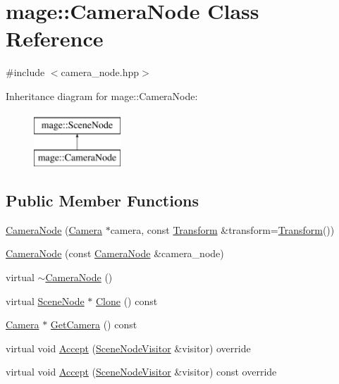 \hypertarget{classmage_1_1_camera_node}{}\section{mage\+:\+:Camera\+Node Class Reference}
\label{classmage_1_1_camera_node}


{\ttfamily \#include $<$camera\+\_\+node.\+hpp$>$}

Inheritance diagram for mage\+:\+:Camera\+Node\+:\begin{figure}[H]
\begin{center}
\leavevmode
\includegraphics[height=2.000000cm]{classmage_1_1_camera_node}
\end{center}
\end{figure}
\subsection*{Public Member Functions}
\begin{DoxyCompactItemize}
\item 
\hyperlink{classmage_1_1_camera_node_aa6b469b939b268275665f5b962b82d4a}{Camera\+Node} (\hyperlink{classmage_1_1_camera}{Camera} $\ast$camera, const \hyperlink{structmage_1_1_transform}{Transform} \&transform=\hyperlink{structmage_1_1_transform}{Transform}())
\item 
\hyperlink{classmage_1_1_camera_node_aa0becc29c416c313ebda763edb1b2181}{Camera\+Node} (const \hyperlink{classmage_1_1_camera_node}{Camera\+Node} \&camera\+\_\+node)
\item 
virtual \hyperlink{classmage_1_1_camera_node_a2b66360b99bf03ee2f66a3a74be31792}{$\sim$\+Camera\+Node} ()
\item 
virtual \hyperlink{classmage_1_1_scene_node}{Scene\+Node} $\ast$ \hyperlink{classmage_1_1_camera_node_adf9a95250d1fd7e6bb9a5850a0aa7817}{Clone} () const
\item 
\hyperlink{classmage_1_1_camera}{Camera} $\ast$ \hyperlink{classmage_1_1_camera_node_a7cd05fd41271259870483de5b3ed6ebe}{Get\+Camera} () const
\item 
virtual void \hyperlink{classmage_1_1_camera_node_aed9c3c12cc4163fed880c49e43380efe}{Accept} (\hyperlink{classmage_1_1_scene_node_visitor}{Scene\+Node\+Visitor} \&visitor) override
\item 
virtual void \hyperlink{classmage_1_1_camera_node_a8b94f57b3a04f70b2c04a3d7c1ba3082}{Accept} (\hyperlink{classmage_1_1_scene_node_visitor}{Scene\+Node\+Visitor} \&visitor) const override
\end{DoxyCompactItemize}
